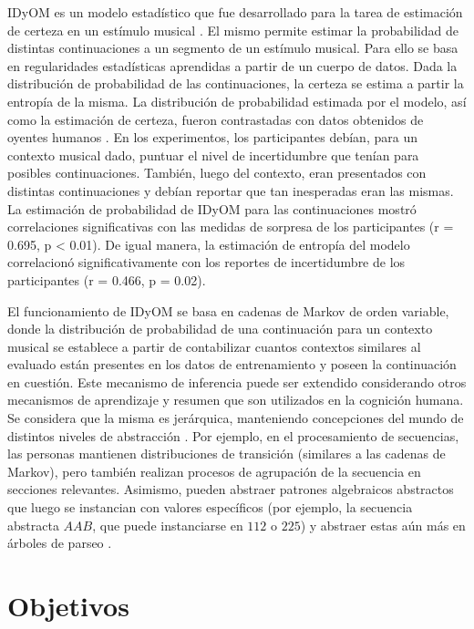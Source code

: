 \documentclass[a4paper,11pt]{article}
\begin{document}
IDyOM es un modelo estadístico que fue desarrollado para la tarea de estimación
de certeza en un estímulo musical \cite{pearce2005construction}. El mismo
permite estimar la probabilidad de distintas continuaciones a un segmento de un
estímulo musical. Para ello se basa en regularidades estadísticas aprendidas a
partir de un cuerpo de datos. Dada la distribución de probabilidad de las
continuaciones, la certeza se estima a partir la entropía de la misma. La
distribución de probabilidad estimada por el modelo, así como la estimación de
certeza, fueron contrastadas con datos obtenidos de oyentes humanos
\cite{hansen2014uncertainty, hansen2016bebop}. En los experimentos, los
participantes debían, para un contexto musical dado, puntuar el nivel de
incertidumbre que tenían para posibles continuaciones. También, luego del
contexto, eran presentados con distintas continuaciones y debían reportar que
tan inesperadas eran las mismas. La estimación de probabilidad de IDyOM para las
continuaciones mostró correlaciones significativas con las medidas de sorpresa
de los participantes (r = 0.695, p < 0.01). De igual manera, la estimación de
entropía del modelo correlacionó significativamente con los reportes de
incertidumbre de los participantes (r = 0.466, p = 0.02).

El funcionamiento de IDyOM se basa en cadenas de Markov de orden variable,
donde la distribución de probabilidad de una continuación para un contexto
musical se establece a partir de contabilizar cuantos contextos similares al
evaluado están presentes en los datos de entrenamiento y poseen la continuación
en cuestión. Este mecanismo de inferencia puede ser extendido considerando
otros mecanismos de aprendizaje y resumen que son utilizados en la cognición
humana. Se considera que la misma es jerárquica, manteniendo concepciones del
mundo de distintos niveles de abstracción \cite{friston2010free}. Por ejemplo,
en el procesamiento de secuencias, las personas mantienen distribuciones de
transición (similares a las cadenas de Markov), pero también realizan procesos
de agrupación de la secuencia en secciones relevantes. Asimismo, pueden
abstraer patrones algebraicos abstractos que luego se instancian con valores
específicos (por ejemplo, la secuencia abstracta $AAB$, que puede instanciarse
en $112$ o $225$) y abstraer estas aún más en árboles de parseo
\cite{dehaene2015neural}.

\section*{Objetivos} 
\end{document}
